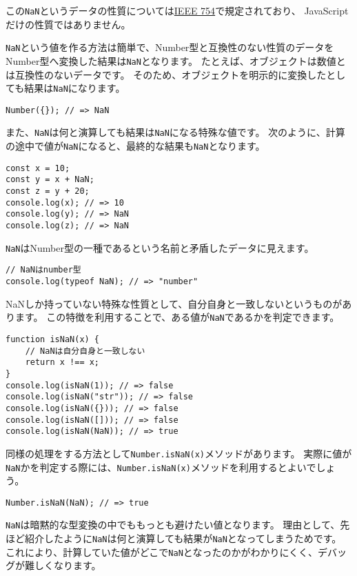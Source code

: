 この\texttt{NaN}というデータの性質については\href{https://ja.wikipedia.org/wiki/IEEE_754}{IEEE
754}で規定されており、 JavaScriptだけの性質ではありません。

\texttt{NaN}という値を作る方法は簡単で、Number型と互換性のない性質のデータをNumber型へ変換した結果は\texttt{NaN}となります。
たとえば、オブジェクトは数値とは互換性のないデータです。
そのため、オブジェクトを明示的に変換したとしても結果は\texttt{NaN}になります。

\begin{lstlisting}
Number({}); // => NaN
\end{lstlisting}

また、\texttt{NaN}は何と演算しても結果は\texttt{NaN}になる特殊な値です。
次のように、計算の途中で値が\texttt{NaN}になると、最終的な結果も\texttt{NaN}となります。

\begin{lstlisting}
const x = 10;
const y = x + NaN;
const z = y + 20;
console.log(x); // => 10
console.log(y); // => NaN
console.log(z); // => NaN
\end{lstlisting}

\texttt{NaN}はNumber型の一種であるという名前と矛盾したデータに見えます。

\begin{lstlisting}
// NaNはnumber型
console.log(typeof NaN); // => "number"
\end{lstlisting}

NaNしか持っていない特殊な性質として、自分自身と一致しないというものがあります。
この特徴を利用することで、ある値が\texttt{NaN}であるかを判定できます。

\begin{lstlisting}
function isNaN(x) {
    // NaNは自分自身と一致しない
    return x !== x;
}
console.log(isNaN(1)); // => false
console.log(isNaN("str")); // => false
console.log(isNaN({})); // => false
console.log(isNaN([])); // => false
console.log(isNaN(NaN)); // => true
\end{lstlisting}

同様の処理をする方法として\texttt{Number.isNaN(x)}メソッドがあります。
実際に値が\texttt{NaN}かを判定する際には、\texttt{Number.isNaN(x)}メソッドを利用するとよいでしょう。

\begin{lstlisting}
Number.isNaN(NaN); // => true
\end{lstlisting}

\texttt{NaN}は暗黙的な型変換の中でももっとも避けたい値となります。
理由として、先ほど紹介したように\texttt{NaN}は何と演算しても結果が\texttt{NaN}となってしまうためです。
これにより、計算していた値がどこで\texttt{NaN}となったのかがわかりにくく、デバッグが難しくなります。

